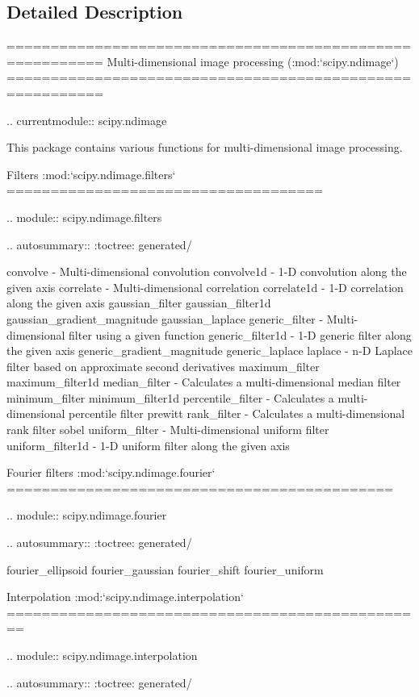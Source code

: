 \subsection{Detailed Description}
\begin{DoxyVerb}=========================================================
Multi-dimensional image processing (:mod:`scipy.ndimage`)
=========================================================

.. currentmodule:: scipy.ndimage

This package contains various functions for multi-dimensional image
processing.


Filters :mod:`scipy.ndimage.filters`
====================================

.. module:: scipy.ndimage.filters

.. autosummary::
   :toctree: generated/

   convolve - Multi-dimensional convolution
   convolve1d - 1-D convolution along the given axis
   correlate - Multi-dimensional correlation
   correlate1d - 1-D correlation along the given axis
   gaussian_filter
   gaussian_filter1d
   gaussian_gradient_magnitude
   gaussian_laplace
   generic_filter - Multi-dimensional filter using a given function
   generic_filter1d - 1-D generic filter along the given axis
   generic_gradient_magnitude
   generic_laplace
   laplace - n-D Laplace filter based on approximate second derivatives
   maximum_filter
   maximum_filter1d
   median_filter - Calculates a multi-dimensional median filter
   minimum_filter
   minimum_filter1d
   percentile_filter - Calculates a multi-dimensional percentile filter
   prewitt
   rank_filter - Calculates a multi-dimensional rank filter
   sobel
   uniform_filter - Multi-dimensional uniform filter
   uniform_filter1d - 1-D uniform filter along the given axis

Fourier filters :mod:`scipy.ndimage.fourier`
============================================

.. module:: scipy.ndimage.fourier

.. autosummary::
   :toctree: generated/

   fourier_ellipsoid
   fourier_gaussian
   fourier_shift
   fourier_uniform

Interpolation :mod:`scipy.ndimage.interpolation`
================================================

.. module:: scipy.ndimage.interpolation

.. autosummary::
   :toctree: generated/


\end{DoxyVerb}
